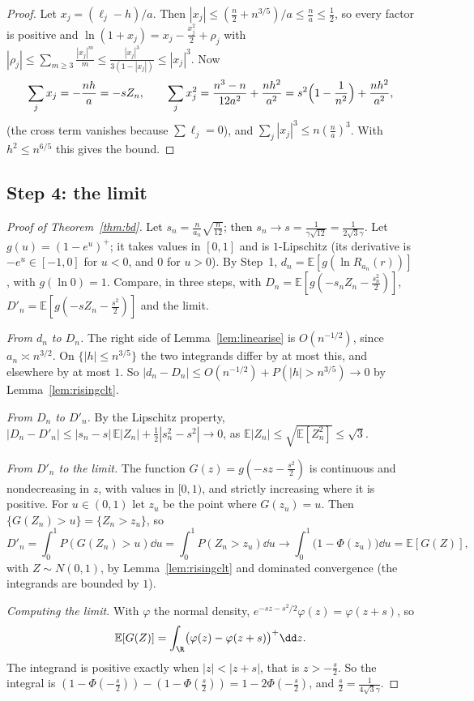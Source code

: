 \begin{proof}
Let $x_j=(\ell_j-h)/a$. Then $|x_j|\le(\frac n2+n^{3/5})/a\le\frac na\le\frac12$, so every factor is positive and $\ln(1+x_j)=x_j-\frac{x_j^2}2+\rho_j$ with
$|\rho_j|\le\sum_{m\ge3}\frac{|x_j|^m}m\le\frac{|x_j|^3}{3(1-|x_j|)}\le|x_j|^3$. Now
\[
\sum_jx_j=-\frac{nh}a=-sZ_n,\qquad\sum_jx_j^2=\frac{n^3-n}{12a^2}+\frac{nh^2}{a^2}=s^2\Bigl(1-\frac1{n^2}\Bigr)+\frac{nh^2}{a^2},
\]
(the cross term vanishes because $\sum\ell_j=0$), and $\sum_j|x_j|^3\le n(\frac na)^3$. With $h^2\le n^{6/5}$ this gives the bound.
\end{proof}

\subsection*{Step 4: the limit}

\begin{proof}[Proof of Theorem~\ref{thm:bd}]
Let $s_n=\frac n{a_n}\sqrt{\frac n{12}}$; then $s_n\to s=\frac1{\gamma\sqrt{12}}=\frac1{2\sqrt3\gamma}$. Let $g(u)=(1-e^u)^+$; it takes values in $[0,1]$ and is $1$-Lipschitz (its derivative is $-e^u\in[-1,0]$ for $u<0$,
and $0$ for $u>0$). By Step~1, $d_n=\mathbb E[g(\ln R_{a_n}(r))]$, with $g(\ln0)=1$. Compare, in three steps, with $D_n=\mathbb E[g(-s_nZ_n-\frac{s_n^2}2)]$, $D'_n=\mathbb E[g(-sZ_n-\frac{s^2}2)]$ and the
limit.

\emph{From $d_n$ to $D_n$.} The right side of Lemma~\ref{lem:linearise} is $O(n^{-1/2})$, since $a_n\asymp n^{3/2}$. On $\{|h|\le n^{3/5}\}$ the two integrands differ by at most this, and
elsewhere by at most $1$. So $|d_n-D_n|\le O(n^{-1/2})+P(|h|>n^{3/5})\to0$ by Lemma~\ref{lem:risingclt}.

\emph{From $D_n$ to $D'_n$.} By the Lipschitz property, $|D_n-D'_n|\le|s_n-s|\,\mathbb E|Z_n|+\frac12|s_n^2-s^2|\to0$, as $\mathbb E|Z_n|\le\sqrt{\mathbb E[Z_n^2]}\le\sqrt3$.

\emph{From $D'_n$ to the limit.} The function $G(z)=g(-sz-\frac{s^2}2)$ is continuous and nondecreasing in $z$, with values in $[0,1)$, and strictly increasing where it is positive.
For $u\in(0,1)$ let $z_u$ be the point where $G(z_u)=u$. Then $\{G(Z_n)>u\}=\{Z_n>z_u\}$, so
\[
D'_n=\int_0^1P(G(Z_n)>u)\dd u=\int_0^1P(Z_n>z_u)\dd u\longrightarrow\int_0^1\bigl(1-\Phi(z_u)\bigr)\dd u=\mathbb E[G(Z)],
\]
with $Z\sim N(0,1)$, by Lemma~\ref{lem:risingclt} and dominated convergence (the integrands are bounded by $1$).

\emph{Computing the limit.} With $\varphi$ the normal density, $e^{-sz-s^2/2}\varphi(z)=\varphi(z+s)$, so
\[
\mathbb E[G(Z)]=\int_\R\bigl(\varphi(z)-\varphi(z+s)\bigr)^+\dd z.
\]
The integrand is positive exactly when $|z|<|z+s|$, that is $z>-\frac s2$. So the integral is $(1-\Phi(-\frac s2))-(1-\Phi(\frac s2))=1-2\Phi(-\frac s2)$, and $\frac s2=\frac1{4\sqrt3\gamma}$.
\end{proof}

